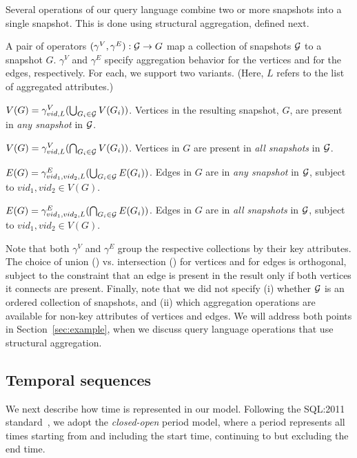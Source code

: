 Several operations of our query language combine two or more snapshots
into a single snapshot. This is done using structural aggregation,
defined next.

\begin{definition}   
A pair of operators $(\gamma^{V}, \gamma^{E}) : {\cal G} \rightarrow
G$ map a collection of snapshots $\cal{G}$ to a snapshot $G$.
$\gamma^{V}$ and $\gamma^{E}$ specify aggregation behavior for the
vertices and for the edges, respectively.  For each, we support two
variants. (Here, $L$ refers to the list of aggregated attributes.)

\insql{[Any V]} $V(G) = \gamma^{V}_{vid, L}(\bigcup_{G_i \in {\cal G}} V(G_i))$.
Vertices in the resulting snapshot, $G$, are present in {\em any
  snapshot} in ${\cal G}$.

\insql{[All V]} $V(G) = \gamma^{V}_{vid, L}(\bigcap_{G_i \in {\cal G}} V(G_i))$.
Vertices in $G$ are present in {\em all snapshots} in ${\cal G}$.

\insql{[Any E]} $E(G) = \gamma^{E}_{vid_1,vid_2, L}(\bigcup_{G_i \in {\cal G}} E(G_i))$.
  Edges in $G$ are in {\em any snapshot} in ${\cal G}$,
  subject to $vid_1, vid_2 \in V(G)$.

\insql{[All E]} $E(G) = \gamma^{E}_{vid_1,vid_2, L}(\bigcap_{G_i \in
  {\cal G}} E(G_i))$.  Edges in $G$ are in {\em all snapshots} in
${\cal G}$, subject to $vid_1, vid_2 \in V(G)$.

\label{def:sgroup}
\end{definition}

Note that both $\gamma^{V}$ and $\gamma^{E}$ group the respective
collections by their key attributes.  The choice of union
() vs. intersection () for vertices and for
edges is orthogonal, subject to the constraint that an edge is present
in the result only if both vertices it connects are present.  Finally,
note that we did not specify (i) whether ${\cal G}$ is an ordered
collection of snapshots, and (ii) which aggregation operations are
available for non-key attributes of vertices and edges.  We will
address both points in Section~\ref{sec:example}, when we discuss
query language operations that use structural aggregation.

\subsection{Temporal sequences}
\label{sec:model:time}

We next describe how time is represented in our model.  Following the
SQL:2011 standard~\cite{DBLP:journals/sigmod/KulkarniM12}, we adopt
the {\em closed-open} period model, where a period represents all
times starting from and including the start time, continuing to but
excluding the end time.

